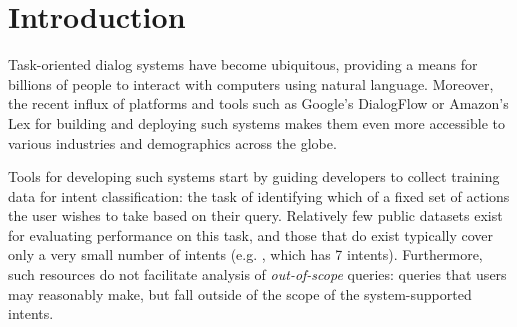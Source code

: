 \documentclass[11pt,a4paper]{article}
\begin{document}


\section{Introduction}
Task-oriented dialog systems have become ubiquitous, providing a means for billions of people to interact with computers using natural language. Moreover, the recent influx of platforms and tools such as Google's DialogFlow or Amazon's Lex for building and deploying such systems makes them even more accessible to various industries and demographics across the globe.

Tools for developing such systems start by guiding developers to collect training data for intent classification: the task of identifying which of a fixed set of actions the user wishes to take based on their query.
Relatively few public datasets exist for evaluating performance on this task, and those that do exist typically cover only a very small number of intents (e.g. \citet{snips}, which has 7 intents).
Furthermore, such resources do not facilitate analysis of \emph{out-of-scope} queries: queries that users may reasonably make, but fall outside of the scope of the system-supported intents.
\end{document}
